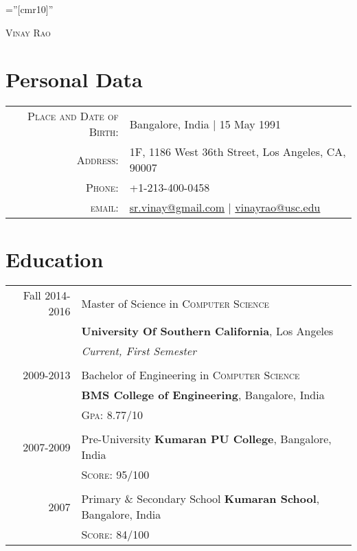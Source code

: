 \documentclass[a4paper,10pt]{article}
\begin{document}
\pagestyle{empty} %

\font\fb=''[cmr10]'' %

\par{\centering
		{\Huge \textsc{Vinay Rao}
	}\bigskip\par}

\section{Personal Data}

\begin{tabular}{rl}
    \textsc{Place and Date of Birth:} & Bangalore, India | 15 May 1991 \\
    \textsc{Address:}   & 1F, 1186 West 36th Street, Los Angeles, CA, 90007 \\
    \textsc{Phone:}     & +1-213-400-0458\\
    \textsc{email:}     & \href{mailto:sr.vinay@gmail.com}{sr.vinay@gmail.com} | \href{mailto:vinayrao@usc.edu}{vinayrao@usc.edu} \\
\end{tabular}

\section{Education}
\begin{tabular}{rl}	
 Fall 2014-2016 & Master of Science in \textsc{Computer Science} \\&\textbf{University Of Southern California}, Los Angeles
\\& \small\emph{Current, First Semester}\\&\\

2009-2013& Bachelor of Engineering in \textsc{Computer Science} \\& \normalsize\textbf{BMS College of Engineering}, Bangalore, India\\
&\normalsize \textsc{Gpa}: 8.77/10\\&\\

2007-2009& Pre-University \textbf{Kumaran PU College}, Bangalore, India\\
&\textsc{Score}: 95/100 \\&\\

2007& Primary \& Secondary School \textbf{Kumaran School}, Bangalore, India\\ &\textsc{Score}: 84/100
\end{tabular}
\end{document}
